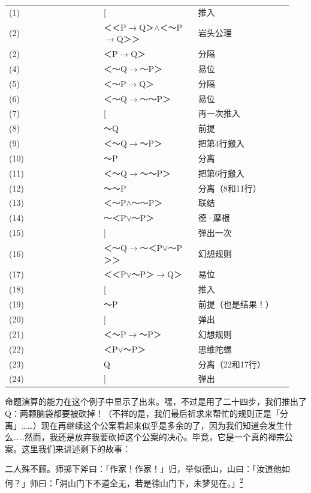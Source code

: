 \documentclass[
  12pt,
  twoside,
  openright,
  oldfontcommands,
]{memoir}
\begin{document}
\begin{longtable}[]{>{\raggedright\arraybackslash}p{0.313\linewidth} >{\raggedright\arraybackslash}p{0.313\linewidth} >{\raggedright\arraybackslash}p{0.313\linewidth}}
\toprule\noalign{}
\endhead
\bottomrule\noalign{}
\endlastfoot
(1) & {[} & 推入 \\
(2) & ＜＜P$\rightarrow$Q＞$\wedge$＜～P$\rightarrow$Q＞＞ & 岩头公理 \\
(2) & ＜P$\rightarrow$Q＞ & 分隔 \\
(4) & ＜～Q$\rightarrow$～P＞ & 易位 \\
(5) & ＜～P$\rightarrow$Q＞ & 分隔 \\
(6) & ＜～Q$\rightarrow$～～P＞ & 易位 \\
(7) & {[} & 再一次推入 \\
(8) & ～Q & 前提 \\
(9) & ＜～Q$\rightarrow$～P＞ & 把第4行搬入 \\
(10) & ～P & 分离 \\
(11) & ＜～Q$\rightarrow$～～P＞ & 把第6行搬入 \\
(12) & ～～P & 分离（8和11行） \\
(13) & ＜～P$\wedge$～～P＞ & 联结 \\
(14) & ～＜P$\vee$～P＞ & 德·摩根 \\
(15) & {]} & 弹出一次 \\
(16) & ＜～Q$\rightarrow$～＜P$\vee$～P＞＞ & 幻想规则 \\
(17) & ＜＜P$\vee$～P＞$\rightarrow$Q＞ & 易位 \\
(18) & {[} & 推入 \\
(19) & ～P & 前提（也是结果！） \\
(20) & {]} & 弹出 \\
(21) & ＜～P$\rightarrow$～P＞ & 幻想规则 \\
(22) & ＜P$\vee$～P＞ & 思维陀螺 \\
(23) & Q & 分离（22和17行） \\
(24) & {]} & 弹出 \\
\end{longtable}

命题演算的能力在这个例子中显示了出来。嘿，不过是用了二十四步，我们推出了Q：两颗脑袋都要被砍掉！（不祥的是，我们最后祈求来帮忙的规则正是「分离」\ldots\ldots）现在再继续这个公案看起来似乎是多余的了，因为我们知道会发生什么\ldots\ldots 然而，我还是放弃我要砍掉这个公案的决心。毕竟，它是一个真的禅宗公案。这里我们来讲述剩下的故事：

二人殊不顾。师掷下斧曰：「作家！作家！」归，举似德山，山曰：「汝道他如何？」师曰：「洞山门下不道全无，若是德山门下，未梦见在。」\hyperref[fn:Chapter07-2]{\textsuperscript{2}}
\end{document}
